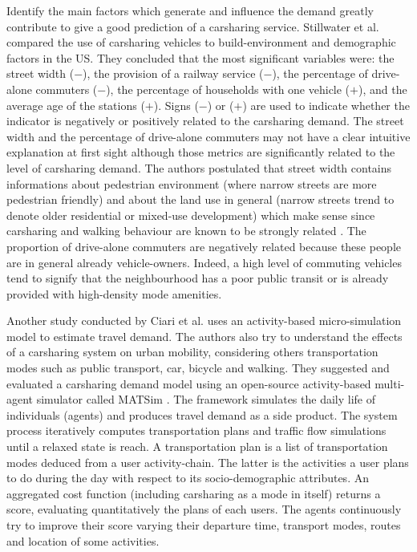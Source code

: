 \begin{bibunit}[ieeetr]
\medskip
Identify the main factors which generate and influence the demand greatly contribute to give a good prediction of a carsharing service.
Stillwater et al. \cite{stillwater_carsharing_2009} compared the use of carsharing vehicles to build-environment and demographic factors in the US.
They concluded that the most significant variables were: the street width ($-$), the provision of a railway service ($-$), the percentage of drive-alone commuters ($-$), 
the percentage of households with one vehicle ($+$), and the average age of the stations ($+$).
Signs ($-$) or ($+$) are used to indicate whether the indicator is negatively or positively related to the carsharing demand.
The street width and the percentage of drive-alone commuters may not have a clear intuitive explanation at first sight although those metrics are significantly related to the level of carsharing demand.
The authors postulated that street width contains informations about pedestrian environment (where narrow streets are more pedestrian friendly) and about the land use in general (narrow streets trend to denote older residential or mixed-use development) which make sense since carsharing and walking behaviour are known to be strongly related \cite{cervero_city_2003}.
The proportion of drive-alone commuters are negatively related because these people are in general already vehicle-owners.
Indeed, a high level of commuting vehicles tend to signify that the neighbourhood has a poor public transit or is already provided with high-density mode amenities.


\medskip
Another study conducted by Ciari et al. \cite{ciari_estimation_2013} uses an activity-based micro-simulation model to estimate travel demand.
The authors also try to understand the effects of a carsharing system on urban mobility, considering others transportation modes such as public transport, car, bicycle and walking.
They suggested and evaluated a carsharing demand model using an open-source activity-based multi-agent simulator called MATSim \cite{matsim_webPage}.
The framework simulates the daily life of individuals (agents) and produces travel demand as a side product.
The system process iteratively computes transportation plans and traffic flow simulations until a relaxed state is reach.
A transportation plan is a list of transportation modes deduced from a user activity-chain.
The latter is the activities a user plans to do during the day with respect to its socio-demographic attributes.
An aggregated cost function (including carsharing as a mode in itself) returns a score, evaluating quantitatively the plans of each users.
The agents continuously try to improve their score varying their departure time, transport modes, routes and location of some activities.


\end{bibunit}
